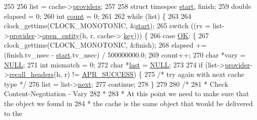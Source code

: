 \begin{DoxyCode}
255 
256     list = cache->\hyperlink{structcache__request__rec_afeb71f387482c679d90de359869b8e10}{providers};
257     
258     \textcolor{keyword}{struct }timespec \hyperlink{group__APACHE__CORE__DAEMON_ga6d3a995932cd00f6b3473898aa90d596}{start}, finish;
259     \textcolor{keywordtype}{double} elapsed = 0;
260     \textcolor{keywordtype}{int} \hyperlink{group__APR__MD5_ga16ff2d8e15ade4948398b0aeb80124a8}{count} = 0;
261 
262     \textcolor{keywordflow}{while} (list) \{
263     
264     clock\_gettime(CLOCK\_MONOTONIC, &\hyperlink{group__APACHE__CORE__DAEMON_ga6d3a995932cd00f6b3473898aa90d596}{start});
265         \textcolor{keywordflow}{switch} ((rv = list->\hyperlink{structcache__provider__list_a1e1caa5b70698f255962728326dc1be3}{provider}->\hyperlink{structcache__provider_ac99f3fba4c7e207f7a121443f16afe18}{open\_entity}(h, r, cache->
      \hyperlink{structcache__request__rec_a564726b5f7e5dc4fee2fb01d178677b4}{key}))) \{
266         \textcolor{keywordflow}{case} \hyperlink{group__APACHE__CORE__DAEMON_gaba51915c87d64af47fb1cc59348961c9}{OK}: \{
267         clock\_gettime(CLOCK\_MONOTONIC, &finish);
268         elapsed += (finish.tv\_nsec - \hyperlink{group__APACHE__CORE__DAEMON_ga6d3a995932cd00f6b3473898aa90d596}{start}.tv\_nsec) / 500000000.0;
269         count++;
270             \textcolor{keywordtype}{char} *vary = \hyperlink{pcre_8txt_ad7f989d16aa8ca809a36bc392c07fba1}{NULL};
271             \textcolor{keywordtype}{int} mismatch = 0;
272             \textcolor{keywordtype}{char} *\hyperlink{group__apr__strings_ga882d08c2e3ad3004cdfc219601ebaac8}{last} = \hyperlink{pcre_8txt_ad7f989d16aa8ca809a36bc392c07fba1}{NULL};
273 
274             \textcolor{keywordflow}{if} (list->\hyperlink{structcache__provider__list_a1e1caa5b70698f255962728326dc1be3}{provider}->\hyperlink{structcache__provider_a1ebbc419cb9f93c27620e0fe993dbd18}{recall\_headers}(h, r) != 
      \hyperlink{group__apr__errno_ga9ee311b7bf1c691dc521d721339ee2a6}{APR\_SUCCESS}) \{
275                 \textcolor{comment}{/* try again with next cache type */}
276                 list = list->\hyperlink{structcache__provider__list_a87c07afc8bb63fe7fd2e9274e60341a9}{next};
277                 \textcolor{keywordflow}{continue};
278             \}
279 
280             \textcolor{comment}{/*}
281 \textcolor{comment}{             * Check Content-Negotiation - Vary}
282 \textcolor{comment}{             *}
283 \textcolor{comment}{             * At this point we need to make sure that the object we found in}
284 \textcolor{comment}{             * the cache is the same object that would be delivered to the}

\end{DoxyCode}
